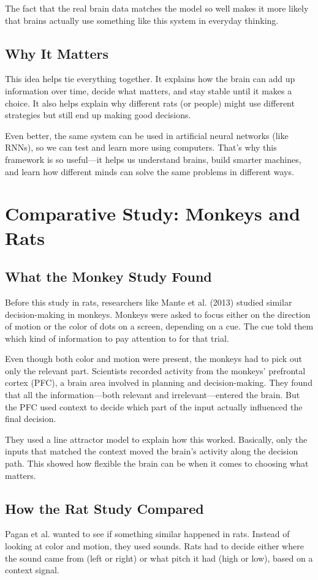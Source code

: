 \documentclass{article}
\begin{document}
The fact that the real brain data matches the model so well makes it more likely that brains actually use something like this system in everyday thinking.

\subsection{Why It Matters}
This idea helps tie everything together. It explains how the brain can add up information over time, decide what matters, and stay stable until it makes a choice. It also helps explain why different rats (or people) might use different strategies but still end up making good decisions.

Even better, the same system can be used in artificial neural networks (like RNNs), so we can test and learn more using computers. That’s why this framework is so useful—it helps us understand brains, build smarter machines, and learn how different minds can solve the same problems in different ways.


\section{Comparative Study: Monkeys and Rats}

\subsection{What the Monkey Study Found}
Before this study in rats, researchers like Mante et al. (2013) studied similar decision-making in monkeys. Monkeys were asked to focus either on the direction of motion or the color of dots on a screen, depending on a cue. The cue told them which kind of information to pay attention to for that trial.

Even though both color and motion were present, the monkeys had to pick out only the relevant part. Scientists recorded activity from the monkeys' prefrontal cortex (PFC), a brain area involved in planning and decision-making. They found that all the information—both relevant and irrelevant—entered the brain. But the PFC used context to decide which part of the input actually influenced the final decision.

They used a line attractor model to explain how this worked. Basically, only the inputs that matched the context moved the brain's activity along the decision path. This showed how flexible the brain can be when it comes to choosing what matters.

\subsection{How the Rat Study Compared}
Pagan et al. wanted to see if something similar happened in rats. Instead of looking at color and motion, they used sounds. Rats had to decide either where the sound came from (left or right) or what pitch it had (high or low), based on a context signal.
\end{document}
